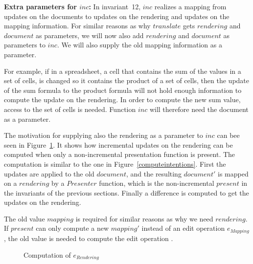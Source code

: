 {\bf }{\bf Extra parameters for $inc$: }In invariant~12, $inc$ realizes a mapping from updates on the documents to updates on the rendering and updates on the mapping information. For similar reasons as why $translate$ gets $rendering$ and $document$ as parameters, we will now also add $rendering$ and $document$ as parameters to $inc$. We will also supply the old mapping information as a parameter.

For example, if in a spreadsheet, a cell that contains the sum of the values in a set of cells, is changed so it contains the product of a set of cells, then the update of the sum formula to the product formula will not hold enough information to compute the update on the rendering. In order to compute the new sum value, access to the set of cells is needed. Function $inc$ will therefore need the document as a parameter. 

The motivation for supplying also the rendering as a parameter to $inc$ can bee seen in Figure~\ref{computeops}. It shows how incremental updates on the rendering can be computed when only a non-incremental presentation function is present. The computation is similar to the one in Figure~\ref{computeintentions}. First the updates are applied to the old $document$, and the resulting $document'$ is mapped on a $rendering$ by a $Presenter$ function, which is the non-incremental $present$ in the invariants of the previous sections. Finally a difference is computed to get the updates on the rendering.

The old value $mapping$ is required for similar reasons as why we need $rendering$. If $present$ can only compute a new $mapping'$ instead of an edit operation $e_{Mapping}$, the old value is needed to compute the edit operation . 
\begin{figure}
\begin{small}
\begin{center}
\begin{center}
\begin{small}
\bigskip \noindent
{}
\end{small}
\end{center}\caption{Computation of $e_{Rendering}$ }\label{computeops} 
\end{center}
\end{small}
\end{figure}




